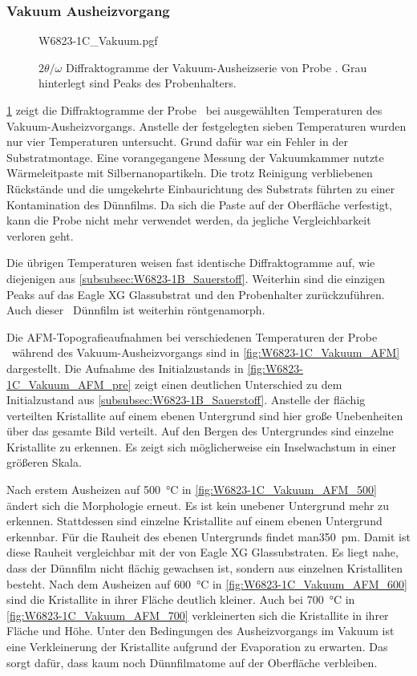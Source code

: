 \subsubsection{Vakuum Ausheizvorgang}\label{subsubsec:W6823-1C_Vakuum}
\begin{figure}
    \centering
    {W6823-1C_Vakuum.pgf}
    \caption{$2\theta/\omega$ Diffraktogramme der Vakuum-Ausheizserie von Probe \samplethree.
    Grau hinterlegt sind Peaks des Probenhalters.}
    \label{fig:W6823-1C_Vakuum_XRD}
\end{figure}
\cref{fig:W6823-1C_Vakuum_XRD} zeigt die Diffraktogramme der Probe \samplethree\ bei
ausgewählten Temperaturen des Vakuum-Ausheizvorgangs.
Anstelle der festgelegten sieben Temperaturen wurden nur vier Temperaturen untersucht.
Grund dafür war ein Fehler in der Substratmontage.
Eine vorangegangene Messung der Vakuumkammer nutzte Wärmeleitpaste mit Silbernanopartikeln.
Die trotz Reinigung verbliebenen Rückstände und die umgekehrte Einbaurichtung des Substrats
führten zu einer Kontamination des Dünnfilms.
Da sich die Paste auf der Oberfläche verfestigt, kann die Probe nicht mehr verwendet werden, da jegliche
Vergleichbarkeit verloren geht.

Die übrigen Temperaturen weisen fast identische Diffraktogramme auf, wie diejenigen aus
\cref{subsubsec:W6823-1B_Sauerstoff}.
Weiterhin sind die einzigen Peaks auf das Eagle XG Glassubstrat und den Probenhalter zurückzuführen.
Auch dieser \heo\ Dünnfilm ist weiterhin röntgenamorph.

Die AFM-Topografieaufnahmen bei verschiedenen Temperaturen der Probe \samplethree\ während des Vakuum-Ausheizvorgangs
sind in \cref{fig:W6823-1C_Vakuum_AFM} dargestellt.
Die Aufnahme des Initialzustands in \cref{fig:W6823-1C_Vakuum_AFM_pre} zeigt einen deutlichen Unterschied zu dem
Initialzustand aus \cref{subsubsec:W6823-1B_Sauerstoff}.
Anstelle der flächig verteilten Kristallite auf einem ebenen Untergrund sind hier große Unebenheiten
über das gesamte Bild verteilt.
Auf den Bergen des Untergrundes sind einzelne Kristallite zu erkennen.
Es zeigt sich möglicherweise ein Inselwachstum in einer größeren Skala.

Nach erstem Ausheizen auf \qty{500}{\degreeCelsius} in \cref{fig:W6823-1C_Vakuum_AFM_500} ändert sich die Morphologie
erneut.
Es ist kein unebener Untergrund mehr zu erkennen.
Stattdessen sind einzelne Kristallite auf einem ebenen Untergrund erkennbar.
Für die Rauheit des ebenen Untergrunds findet man\qty{350}{\pico\meter}.
Damit ist diese Rauheit vergleichbar mit der von Eagle XG Glassubstraten.
Es liegt nahe, dass der Dünnfilm nicht flächig gewachsen ist, sondern aus einzelnen Kristalliten besteht.
Nach dem Ausheizen auf \qty{600}{\degreeCelsius} in \cref{fig:W6823-1C_Vakuum_AFM_600} sind die Kristallite in ihrer
Fläche deutlich kleiner.
Auch bei \qty{700}{\degreeCelsius} in \cref{fig:W6823-1C_Vakuum_AFM_700} verkleinerten sich die Kristallite
in ihrer Fläche und Höhe.
Unter den Bedingungen des Ausheizvorgangs im Vakuum ist eine Verkleinerung der Kristallite aufgrund der Evaporation zu
erwarten.
Das sorgt dafür, dass kaum noch Dünnfilmatome auf der Oberfläche verbleiben.

